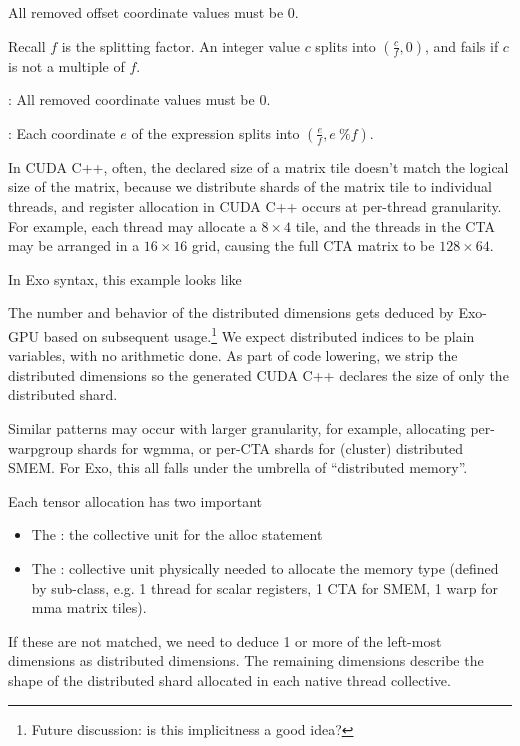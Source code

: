\filbreak
{} All removed offset coordinate values must be 0.

\filbreak
{} Recall $f$ is the splitting factor. An integer value $c$ splits into $(\frac{c}{f}, 0)$, and fails if $c$ is not a multiple of $f$.

\filbreak
{}: All removed coordinate values must be 0.

\filbreak
{}: Each coordinate $e$ of the expression splits into $(\frac{e}{f}, e~\%f)$.

\FloatBarrier

\newpage
{}

In CUDA C++, often, the declared size of a matrix tile doesn't match the logical size of the matrix, because we distribute shards of the matrix tile to individual threads, and register allocation in CUDA C++ occurs at per-thread granularity.
For example, each thread may allocate a $8 \times 4$ tile, and the threads in the CTA may be arranged in a $16 \times 16$ grid, causing the full CTA matrix to be $128 \times 64$.

\filbreak
In Exo syntax, this example looks like



\filbreak
The number and behavior of the distributed dimensions gets deduced by Exo-GPU based on subsequent usage.\footnote{Future discussion: is this implicitness a good idea?}
We expect distributed indices to be plain variables, with no arithmetic done.
As part of code lowering, we strip the distributed dimensions so the generated CUDA C++ declares the size of only the distributed shard.



\filbreak
Similar patterns may occur with larger granularity, for example, allocating per-warpgroup shards for wgmma, or per-CTA shards for (cluster) distributed SMEM.
For Exo, this all falls under the umbrella of ``distributed memory''.

\filbreak
Each tensor allocation has two important 
\begin{itemize}
  \item The : the collective unit for the alloc statement
  \filbreak
  \item The : collective unit physically needed to allocate the memory type (defined by  sub-class, e.g. 1 thread for scalar registers, 1 CTA for SMEM, 1 warp for mma matrix tiles).
\end{itemize}
\filbreak
If these are not matched, we need to deduce 1 or more of the left-most dimensions as distributed dimensions.
The remaining dimensions describe the shape of the distributed shard allocated in each native thread collective.

